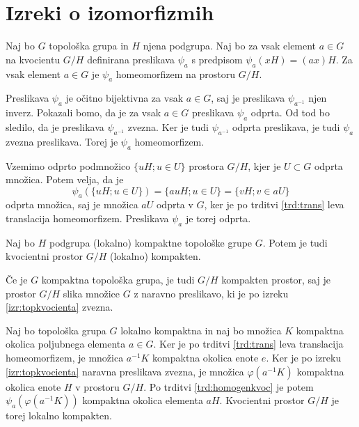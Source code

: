 \documentclass[mat1]{fmfdelo}
\begin{document}
\section{Izreki o izomorfizmih}

\begin{trditev}\label{trd:homogenkvoc}
	Naj bo $G$ topološka grupa in $H$ njena podgrupa. Naj bo za vsak element $a \in G$ na kvocientu $G/H$ definirana preslikava $\psi_a$ s predpisom $\psi_a(xH) = (ax)H$.
	Za vsak element $a \in G$ je $\psi_a$ homeomorfizem na prostoru $G/H$.
\end{trditev}

\begin{dokaz}
Preslikava $\psi_a$ je očitno bijektivna za vsak $a \in G$, saj je preslikava $\psi_{a^{-1}}$ njen inverz. Pokazali bomo, da je za vsak $a \in G$ preslikava $\psi_a$ odprta. Od tod bo sledilo, da je preslikava $\psi_{a^{-1}}$ zvezna. Ker je tudi $\psi_{a^{-1}}$ odprta preslikava, je tudi $\psi_a$ zvezna preslikava. Torej je $\psi_a$ homeomorfizem.

Vzemimo odprto podmnožico $\lbrace uH ; u \in U \rbrace$ prostora $G/H$, kjer je $U \subset G$ odprta množica. Potem velja, da je
\[ \psi_a(\lbrace uH ; u \in U \rbrace) = \lbrace auH ; u \in U \rbrace = \lbrace vH ; v \in aU \rbrace \]
odprta množica, saj je množica $aU$ odprta v $G$, ker je po trditvi \ref{trd:trans} leva translacija homeomorfizem. Preslikava $\psi_a$ je torej odprta.
\end{dokaz}

\begin{trditev}\label{trd:kvockompakt}
	Naj bo $H$ podgrupa (lokalno) kompaktne topološke grupe $G$. Potem je tudi kvocientni prostor $G/H$ (lokalno) kompakten.
\end{trditev}

\begin{dokaz}
Če je $G$ kompaktna topološka grupa, je tudi $G/H$ kompakten prostor, saj je prostor $G/H$ slika množice $G$ z naravno preslikavo, ki je po izreku \ref{izr:topkvocienta} zvezna.

Naj bo topološka grupa $G$ lokalno kompaktna in naj bo množica $K$ kompaktna okolica poljubnega elementa $a \in G$. Ker je po trditvi \ref{trd:trans} leva translacija homeomorfizem, je množica $a^{-1}K$ kompaktna okolica enote $e$. Ker je po izreku \ref{izr:topkvocienta} naravna preslikava zvezna, je množica $\varphi(a^{-1}K)$ kompaktna okolica enote $H$ v prostoru $G/H$. Po trditvi \ref{trd:homogenkvoc} je potem $\psi_a(\varphi(a^{-1}K))$ kompaktna okolica elementa $aH$. Kvocientni prostor $G/H$ je torej lokalno kompakten.
\end{dokaz}
\end{document}
